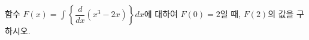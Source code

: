 함수 $F(x)=\displaystyle\int \left\{\dfrac{d}{dx}(x^3-2x)\right\}dx$에 대하여 $F(0)=2$일 때, $F(2)$의 값을 구하시오.
